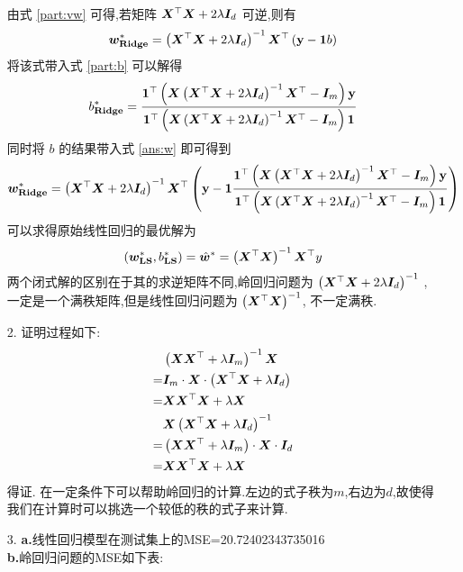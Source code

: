 \documentclass[answers]{exam}  %
\begin{document}
\begin{questions}
\begin{solution}
\begin{enumerate}
\begin{align}
			      \end{align}
			      由式 \ref{part:vw} 可得,若矩阵 $\boldsymbol{X}^\top\boldsymbol{X}+2\lambda\boldsymbol{I}_d$ 可逆,则有
			      \begin{equation}
				      \boldsymbol{w}_{\mathbf{Ridge}}^{*}=\left(\boldsymbol{X}^\top\boldsymbol{X}+2\lambda\boldsymbol{I}_d\right)^{-1}\boldsymbol{X}^\top\left(\mathbf{y}-\boldsymbol{1} b\right)\label{ans:w}
			      \end{equation}
			      将该式带入式 \ref{part:b} 可以解得
			      \begin{equation*}
				      b_{\mathbf{Ridge}}^{*}=\frac{\boldsymbol{1}^\top\left(\boldsymbol{X}\left(\boldsymbol{X}^\top\boldsymbol{X}+2\lambda\boldsymbol{I}_d\right)^{-1}\boldsymbol{X}^\top-\boldsymbol{I}_m\right)\mathbf y}{\boldsymbol{1}^\top\left(\boldsymbol{X}\left(\boldsymbol{X}^\top\boldsymbol{X}+2\lambda\boldsymbol{I}_d\right)^{-1}\boldsymbol{X}^\top-\boldsymbol{I}_m\right)\boldsymbol{1}}
			      \end{equation*}
			      同时将 $b$ 的结果带入式 \ref{ans:w} 即可得到
			      \begin{align*}
				      \boldsymbol{w}_{\mathbf{Ridge}}^{*}=\left(\boldsymbol{X}^\top\boldsymbol{X}+2\lambda\boldsymbol{I}_d\right)^{-1}\boldsymbol{X}^\top\left(\mathbf{y}-\boldsymbol{1} \frac{\boldsymbol{1}^\top\left(\boldsymbol{X}\left(\boldsymbol{X}^\top\boldsymbol{X}+2\lambda\boldsymbol{I}_d\right)^{-1}\boldsymbol{X}^\top-\boldsymbol{I}_m\right)\mathbf y}{\boldsymbol{1}^\top\left(\boldsymbol{X}\left(\boldsymbol{X}^\top\boldsymbol{X}+2\lambda\boldsymbol{I}_d\right)^{-1}\boldsymbol{X}^\top-\boldsymbol{I}_m\right)\boldsymbol{1}}\right)
			      \end{align*}
			      可以求得原始线性回归的最优解为
			      \begin{equation*}
				      \left(\boldsymbol{w}_{\mathbf{LS}}^*, b_{\mathbf{LS}}^*\right) = \hat{\boldsymbol{w}}^*=\left(\boldsymbol{X}^\top\boldsymbol{X}\right)^{-1}\boldsymbol{X}^\top y
			      \end{equation*}
			      两个闭式解的区别在于其的求逆矩阵不同,岭回归问题为  $\left(\boldsymbol{X}^\top\boldsymbol{X}+2\lambda\boldsymbol{I}_d\right)^{-1}$ ,一定是一个满秩矩阵,但是线性回归问题为 $\left(\boldsymbol{X}^\top\boldsymbol{X}\right)^{-1}$, 不一定满秩.
			\item[2.]
			      证明过程如下:
			      \begin{align*}
				       & \left(\boldsymbol{X} \boldsymbol{X}^{\top}+\lambda \boldsymbol{I}_m\right)^{-1} \boldsymbol{X} \\=&\boldsymbol{I}_m\cdot \boldsymbol{X}\cdot \left(\boldsymbol{X}^{\top} \boldsymbol{X}+\lambda \boldsymbol{I}_d\right)\\=&\boldsymbol{X}\boldsymbol{X}^\top\boldsymbol{X}+\lambda \boldsymbol{X}\\
				       & \boldsymbol{X}\left(\boldsymbol{X}^{\top} \boldsymbol{X}+\lambda \boldsymbol{I}_d\right)^{-1}  \\=&\left(\boldsymbol{X} \boldsymbol{X}^{\top}+\lambda \boldsymbol{I}_m\right)\cdot \boldsymbol{X}\cdot\boldsymbol{I}_d\\=&\boldsymbol{X}\boldsymbol{X}^\top\boldsymbol{X}+\lambda \boldsymbol{X}
			      \end{align*}
			      得证.
			      在一定条件下可以帮助岭回归的计算.左边的式子秩为$m$,右边为$d$,故使得我们在计算时可以挑选一个较低的秩的式子来计算.
			\item[3.]
			      \textbf{a.}线性回归模型在测试集上的MSE=20.72402343735016\\
			      \textbf{b.}岭回归问题的MSE如下表:


\end{enumerate}
\end{solution}
\end{questions}
\end{document}
